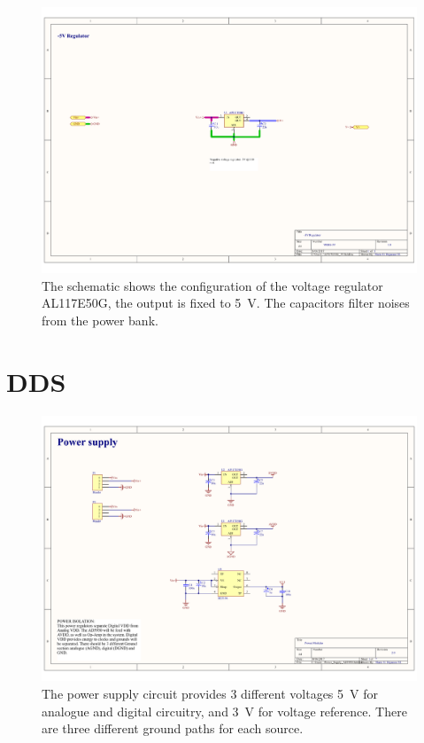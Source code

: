 \begin{landscape}
\begin{figure}[!htpb]
	\centering
	\includegraphics[width=\paperwidth,keepaspectratio]{power_supply_5}
	\caption[Schematic of the \SI{5}{\volt} voltage regulator]{The schematic shows the configuration of the voltage regulator AL117E50G, the output is fixed to \SI{5}{\volt}. The capacitors filter noises from the power bank.}
	\label{fig:schematic PS 5}
\end{figure}
\end{landscape}


\section*{DDS}
\label{Appendix: DDS PS}
\begin{figure}[!htpb]
	\centering
	\includegraphics[width=0.9\paperwidth,keepaspectratio,angle=90]{DDS_power_supply}
	\caption[Schematic of the Power supply of the DDS]{The power supply circuit provides 3 different voltages \SI{5}{\volt} for analogue and digital circuitry, and \SI{3}{\volt} for voltage reference. There are three different ground paths for each source. }
	\label{fig:DDS PS}
\end{figure}


